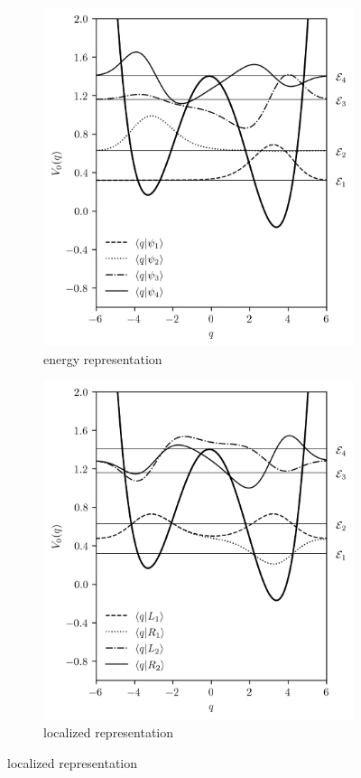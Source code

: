\documentclass[preprint]{revtex4-2}
\begin{document}
\begin{figure}[H]
    \centering
    \begin{subfigure}[b]{0.45\textwidth}
        \caption{energy representation}
        \includegraphics[width=\textwidth]{images/DDS_ENERGY_BASIS.png}
    \end{subfigure}
    \begin{subfigure}[b]{0.45\textwidth}
        \caption{localized representation}
        \includegraphics[width=\textwidth]{images/DDS_LOCALIZED_BASIS.png}

\end{subfigure}
\end{figure}
\end{document}
